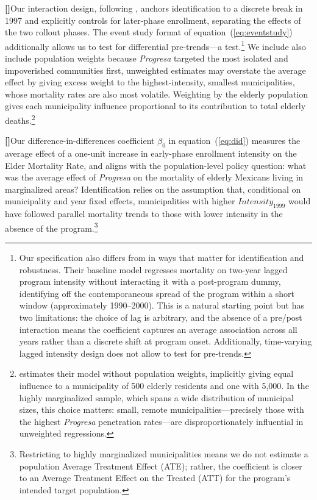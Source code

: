 \documentclass[12pt]{article}
\newcounter{paragraphnum}
\newcommand{\p}{\refstepcounter{paragraphnum}\textbf{[\theparagraphnum]}\enspace}
\begin{document}
\p Our interaction design, following \cite{parker2023conditional}, anchors identification to a discrete break in 1997 and explicitly controls for later-phase enrollment, separating the effects of the two rollout phases. The event study format of equation~(\ref{eq:eventstudy}) additionally allows us to test for differential pre-trends—a test.\footnote{Our specification also differs from \cite{BarhamRowberry2013JDE} in ways that matter for identification and robustness. Their baseline model regresses mortality on two-year lagged program intensity without interacting it with a post-program dummy, identifying off the contemporaneous spread of the program within a short window (approximately 1990--2000). This is a natural starting point but has two limitations: the choice of lag is arbitrary, and the absence of a pre/post interaction means the coefficient captures an average association across all years rather than a discrete shift at program onset. Additionally, time-varying lagged intensity design does not allow to test for pre-trends.} We include also include population weights because \textit{Progresa} targeted the most isolated and impoverished communities first, unweighted estimates may overstate the average effect by giving excess weight to the highest-intensity, smallest municipalities, whose mortality rates are also most volatile. Weighting by the elderly population gives each municipality influence proportional to its contribution to total elderly deaths.\footnote{\cite{BarhamRowberry2013JDE} estimates their model without population weights, implicitly giving equal influence to a municipality of 500 elderly residents and one with 5,000. In the highly marginalized sample, which spans a wide distribution of municipal sizes, this choice matters: small, remote municipalities—precisely those with the highest \textit{Progresa} penetration rates—are disproportionately influential in unweighted regressions. }


\p Our difference-in-differences coefficient $\beta_0$ in equation~(\ref{eq:did}) measures the average effect of a one-unit increase in early-phase enrollment intensity on the Elder Mortality Rate, and aligns with the population-level policy question: what was the average effect of \textit{Progresa} on the mortality of elderly Mexicans living in marginalized areas? Identification relies on the assumption that, conditional on municipality and year fixed effects, municipalities with higher $\textit{Intensity}_{1999}$ would have followed parallel mortality trends to those with lower intensity in the absence of the program.\footnote{Restricting to highly marginalized municipalities means we do not estimate a population Average Treatment Effect (ATE); rather, the coefficient is closer to an Average Treatment Effect on the Treated (ATT) for the program's intended target population.}
\end{document}
